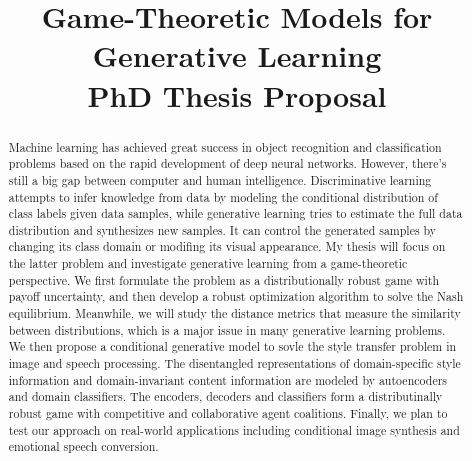 \documentclass{article}
\title{Game-Theoretic Models for Generative Learning \\{\normalsize PhD Thesis Proposal}
}
\begin{document}

\maketitle

\begin{abstract}
Machine learning has achieved great success in object recognition and classification problems based on the rapid development of deep neural networks. However, there's still a big gap between computer and human intelligence.
Discriminative learning attempts to infer knowledge from data by modeling the conditional distribution of class labels given data samples, while generative learning tries to estimate the full data distribution and synthesizes new samples. It can control the generated samples by changing its class domain or modifing its visual appearance.
My thesis will focus on the latter problem and investigate generative learning from a game-theoretic perspective. We first formulate the problem as a distributionally robust game with payoff uncertainty, and then develop a robust optimization algorithm to solve the Nash equilibrium.
Meanwhile, we will study the distance metrics that measure the similarity between distributions, which is a major issue in many generative learning problems.
We then propose a conditional generative model to sovle the style transfer problem in image and speech processing. The disentangled representations of domain-specific style information and domain-invariant content information are modeled by autoencoders and domain classifiers. The encoders, decoders and classifiers form a distributinally robust game with competitive and collaborative agent coalitions. Finally, we plan to test our approach on real-world applications including conditional image synthesis and emotional speech conversion.

\end{abstract}
\end{document}
